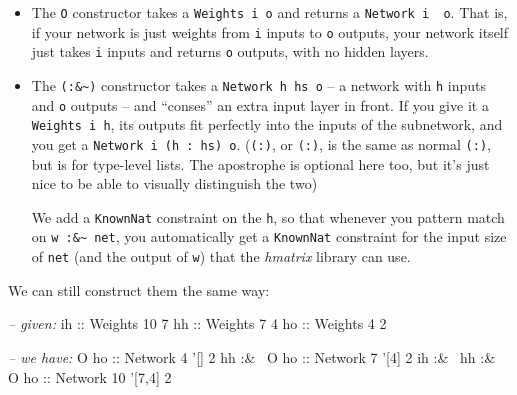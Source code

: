 \documentclass[]{article}
\newenvironment{Shaded}{}{}
\newcommand{\CommentTok}[1]{\textcolor[rgb]{0.38,0.63,0.69}{\textit{#1}}}
\newcommand{\DataTypeTok}[1]{\textcolor[rgb]{0.56,0.13,0.00}{#1}}
\newcommand{\DecValTok}[1]{\textcolor[rgb]{0.25,0.63,0.44}{#1}}
\newcommand{\FunctionTok}[1]{\textcolor[rgb]{0.02,0.16,0.49}{#1}}
\newcommand{\NormalTok}[1]{#1}
\newcommand{\OtherTok}[1]{\textcolor[rgb]{0.00,0.44,0.13}{#1}}
\begin{document}
\begin{itemize}
\item
  The \texttt{O} constructor takes a \texttt{Weights\ i\ o} and returns a
  \texttt{Network\ i\ \textquotesingle{}{[}{]}\ o}. That is, if your network is
  just weights from \texttt{i} inputs to \texttt{o} outputs, your network itself
  just takes \texttt{i} inputs and returns \texttt{o} outputs, with no hidden
  layers.
\item
  The \texttt{(:\&\textasciitilde{})} constructor takes a
  \texttt{Network\ h\ hs\ o} -- a network with \texttt{h} inputs and \texttt{o}
  outputs -- and ``conses'' an extra input layer in front. If you give it a
  \texttt{Weights\ i\ h}, its outputs fit perfectly into the inputs of the
  subnetwork, and you get a
  \texttt{Network\ i\ (h\ \textquotesingle{}:\ hs)\ o}.
  (\texttt{(\textquotesingle{}:)}, or \texttt{(:)}, is the same as normal
  \texttt{(:)}, but is for type-level lists. The apostrophe is optional here
  too, but it's just nice to be able to visually distinguish the two)

  We add a \texttt{KnownNat} constraint on the \texttt{h}, so that whenever you
  pattern match on \texttt{w\ :\&\textasciitilde{}\ net}, you automatically get
  a \texttt{KnownNat} constraint for the input size of \texttt{net} (and the
  output of \texttt{w}) that the \emph{hmatrix} library can use.
\end{itemize}

We can still construct them the same way:

\begin{Shaded}
\begin{Highlighting}[]
\CommentTok{-- given:}
\OtherTok{ih ::} \DataTypeTok{Weights} \DecValTok{10} \DecValTok{7}
\OtherTok{hh ::} \DataTypeTok{Weights}  \DecValTok{7} \DecValTok{4}
\OtherTok{ho ::} \DataTypeTok{Weights}  \DecValTok{4} \DecValTok{2}

\CommentTok{-- we have:}
              \DataTypeTok{O}\OtherTok{ ho ::} \DataTypeTok{Network}  \DecValTok{4}\NormalTok{ '[] }\DecValTok{2}
\NormalTok{       hh }\FunctionTok{:&~} \DataTypeTok{O}\OtherTok{ ho ::} \DataTypeTok{Network}  \DecValTok{7}\NormalTok{ '[}\DecValTok{4}\NormalTok{] }\DecValTok{2}
\NormalTok{ih }\FunctionTok{:&~}\NormalTok{ hh }\FunctionTok{:&~} \DataTypeTok{O}\OtherTok{ ho ::} \DataTypeTok{Network} \DecValTok{10}\NormalTok{ '[}\DecValTok{7}\NormalTok{,}\DecValTok{4}\NormalTok{] }\DecValTok{2}
\end{Highlighting}
\end{Shaded}
\end{document}
